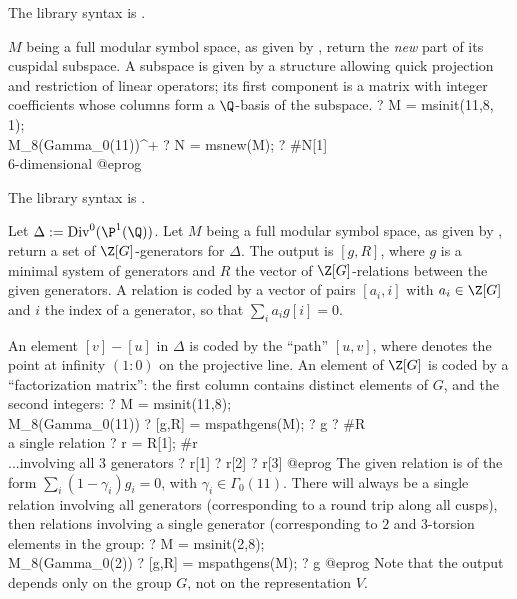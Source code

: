 The library syntax is .

\label{se:msnew}
$M$ being a full modular symbol space, as given by ,
return the \emph{new} part of its cuspidal subspace. A subspace is given by
a structure allowing quick projection and restriction of linear operators;
its first component is a matrix with integer coefficients whose columns form
a $\Q$-basis of the subspace.
\bprog
? M = msinit(11,8, 1); \\ M_8(Gamma_0(11))^+
? N = msnew(M);
? #N[1]  \\ 6-dimensional
@eprog

The library syntax is .

\label{se:mspathgens}
Let $\Delta:=\text{Div}^0(\P^1(\Q))$.
Let $M$ being a full modular symbol space, as given by ,
return a set of $\Z[G]$-generators for $\Delta$. The output
is $[g,R]$, where $g$ is a minimal system of generators and $R$
the vector of $\Z[G]$-relations between the given generators. A
relation is coded by a vector of pairs $[a_i,i]$ with $a_i\in \Z[G]$
and $i$ the index of a generator, so that $\sum_i a_i g[i] = 0$.

An element $[v]-[u]$ in $\Delta$ is coded by the ``path'' $[u,v]$,
where  denotes the point at infinity $(1:0)$ on the projective
line.
An element of $\Z[G]$ is coded by a ``factorization matrix'': the first
column contains distinct elements of $G$, and the second integers:
\bprog
? M = msinit(11,8); \\ M_8(Gamma_0(11))
? [g,R] = mspathgens(M);
? g
? #R  \\ a single relation
? r = R[1]; #r \\ ...involving all 3 generators
? r[1]
? r[2]
? r[3]
@eprog\noindent
The given relation is of the form $\sum_i (1-\gamma_i) g_i = 0$, with
$\gamma_i\in \Gamma_0(11)$. There will always be a single relation involving
all generators (corresponding to a round trip along all cusps), then
relations involving a single generator (corresponding to $2$ and $3$-torsion
elements in the group:
\bprog
? M = msinit(2,8); \\ M_8(Gamma_0(2))
? [g,R] = mspathgens(M);
? g
@eprog\noindent
Note that the output depends only on the group $G$, not on the
representation $V$.


